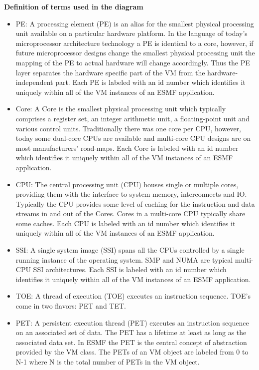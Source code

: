 {\bf Definition of terms used in the diagram}

\begin{itemize}

\item PE: A processing element (PE) is an alias for the smallest physical processing unit available on a particular hardware platform. In the language of today's microprocessor architecture technology a PE is identical to a core, however, if future microprocessor designs change the smallest physical processing unit the mapping of the PE to actual hardware will change accordingly. Thus the PE layer separates the hardware specific part of the VM from the hardware-independent part. Each PE is labeled with an id number which identifies it uniquely within all of the VM instances of an ESMF application.

\item Core: A Core is the smallest physical processing unit which typically comprises a register set, an integer arithmetic unit, a floating-point unit and various control units. Traditionally there was one core per CPU, however, today some dual-core CPUs are available and  multi-core CPU designs are on most manufacturers' road-maps. Each Core is labeled with an id number which identifies it uniquely within all of the VM instances of an ESMF application.

\item CPU: The central processing unit (CPU) houses single or multiple cores, providing them with the interface to system memory, interconnects and IO. Typically the CPU provides some level of caching for the instruction and data streams in and out of the Cores. Cores in a multi-core CPU typically share some caches. Each CPU is labeled with an id number which identifies it uniquely within all of the VM instances of an ESMF application.

\item SSI: A single system image (SSI) spans all the CPUs controlled by a single running instance of the operating system. SMP and NUMA are typical multi-CPU SSI architectures. Each SSI is labeled with an id number which identifies it uniquely within all of the VM instances of an ESMF application.

\item TOE: A thread of execution (TOE) executes an instruction sequence. TOE's come in two flavors: PET and TET.

\item PET: A persistent execution thread (PET) executes an instruction sequence on an associated set of data. The PET has a lifetime at least as long as the associated data set. In ESMF the PET is the central concept of abstraction provided by the VM class. The PETs of an VM object are labeled from 0 to N-1 where N is the total number of PETs in the VM object.


\end{itemize}
